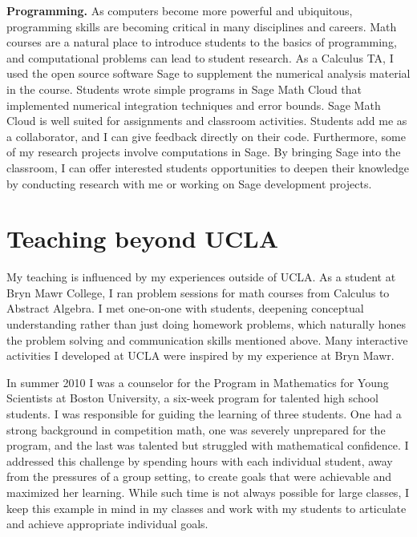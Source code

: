 \documentclass[12pt]{article}
\begin{document}
\textbf{Programming.}  As computers become more powerful and ubiquitous, programming skills are becoming critical in many disciplines and careers.  Math courses are a natural place to introduce students to the basics of programming, and computational problems can lead to student research.  As a Calculus TA, I used the open source software Sage to supplement the numerical analysis material in the course.  Students wrote simple programs in Sage Math Cloud that implemented numerical integration techniques and error bounds.  Sage Math Cloud is well suited for assignments and classroom activities.  Students add me as a collaborator, and I can give feedback directly on their code.  Furthermore, some of my research projects involve computations in Sage.  By bringing Sage into the classroom, I can offer interested students opportunities to deepen their knowledge by conducting research with me or working on Sage development projects.  

\section*{Teaching beyond UCLA}
My teaching is influenced by my experiences outside of UCLA.  As a student at Bryn Mawr College, I ran problem sessions for math courses from Calculus to Abstract Algebra.  I met one-on-one with students, deepening conceptual understanding rather than just doing homework problems, which naturally hones the problem solving and communication skills mentioned above.  Many interactive activities I developed at UCLA were inspired by my experience at Bryn Mawr.

In summer 2010 I was a counselor for the Program in Mathematics for Young Scientists at Boston University, a six-week program for talented high school students.  I was responsible for guiding the learning of three students.  One had a strong background in competition math, one was severely unprepared for the program, and the last was talented but struggled with mathematical confidence.  I addressed this challenge by spending hours with each individual student, away from the pressures of a group setting, to create goals that were achievable and maximized her learning.  While such time is not always possible for large classes, I keep this example in mind in my classes and work with my students to articulate and achieve appropriate individual goals.
\end{document}
